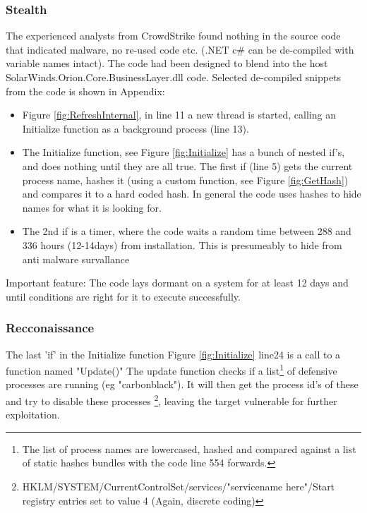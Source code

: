 \documentclass[
	letterpaper, %
	10pt, %
	unnumberedsections, %
	twoside, %
]{LTJournalArticle}
\begin{document}
\subsubsection{Stealth}
The experienced analysts from CrowdStrike found nothing in the source code that indicated malware, no re-used code etc. (.NET c\# can be de-compiled with variable names intact). The code had been designed to blend into the host SolarWinds.Orion.Core.BusinessLayer.dll code. Selected de-compiled snippets from the code is shown in Appendix:

\begin{itemize}
\item{Figure \ref{fig:RefreshInternal}, in line 11 a new thread is started, calling an Initialize function as a background process (line 13).} 
\item{
The Initialize function, see Figure \ref{fig:Initialize} has a bunch of nested if's, and does nothing until they are all true. The first if (line 5) gets the current process name, hashes it (using a custom function, see Figure \ref*{fig:GetHash}) and compares it to a hard coded hash. In general the code uses hashes to hide names for what it is looking for.}
\item{The 2nd if is a timer, where the code waits a random time between 288 and 336 hours (12-14days) from installation. This is presumeably to hide from anti malware survallance}     
\end{itemize}

Important feature: The code lays dormant on a system for at least 12 days and until conditions are right for it to execute successfully. 

\subsubsection{Recconaissance}
The last 'if' in the Initialize function Figure \ref{fig:Initialize} line24 is a call to a function named "Update()"
The update function checks if a list\footnote{The list of process names are lowercased, hashed and compared against a list of static hashes bundles with the code\cite{SolarWindsOrionCoreBusinessLayerdll} line 554 forwards.} of defensive processes are running (eg "carbonblack"). It will then get the process id's of these and try to disable these processes
\footnote{HKLM/SYSTEM/CurrentControlSet/services/"servicename here"/Start registry entries set to value 4 (Again, discrete coding)}, leaving the target vulnerable for further exploitation. 
\par
\end{document}
